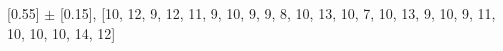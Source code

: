 
[0.55] $\pm$ [0.15], [10, 12, 9, 12, 11, 9, 10, 9, 9, 8, 10, 13, 10, 7, 10, 13, 9, 10, 9, 11, 10, 10, 10, 14, 12]\\
